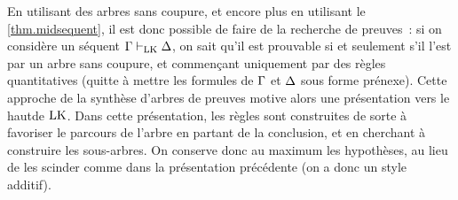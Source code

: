 En utilisant des arbres sans coupure, et encore plus en utilisant le
\cref{thm.midsequent}, il est donc possible de faire de la recherche de
preuves~: si on considère un séquent $\Gamma\vdash_{\operatorname{LK}}\Delta$, on sait qu'il est
prouvable si et seulement s'il l'est par un arbre sans coupure, et commençant
uniquement par des règles quantitatives (quitte à mettre les formules de
$\Gamma$ et $\Delta$ sous forme prénexe). Cette approche de la synthèse d'arbres
de preuves motive alors une présentation \og vers le haut\fg de $\operatorname{LK}$. Dans
cette présentation, les règles sont construites de sorte à favoriser le
parcours de l'arbre en partant de la conclusion, et en cherchant à construire
les sous-arbres. On conserve donc au maximum les hypothèses, au lieu de les
scinder comme dans la présentation précédente (on a donc un style additif).

